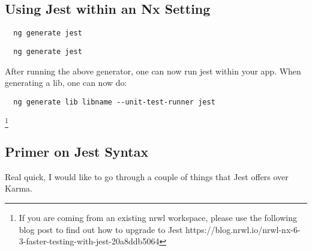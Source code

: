 \subsection{ Using Jest within an Nx Setting }
\begin{verbatim}
  ng generate jest
\end{verbatim}

\begin{verbatim}
  ng generate jest
\end{verbatim}

After running the above generator, one can now run jest within your app. When
generating a lib, one can now do:
\begin{verbatim}
  ng generate lib libname --unit-test-runner jest
\end{verbatim}

\footnote{If you are coming from an existing nrwl workspace, please use the
following blog post to find out how to upgrade to Jest https://blog.nrwl.io/nrwl-nx-6-3-faster-testing-with-jest-20a8ddb5064}

\subsection{ Primer on Jest Syntax }
Real quick, I would like to go through a couple of things that Jest offers over
Karma.
